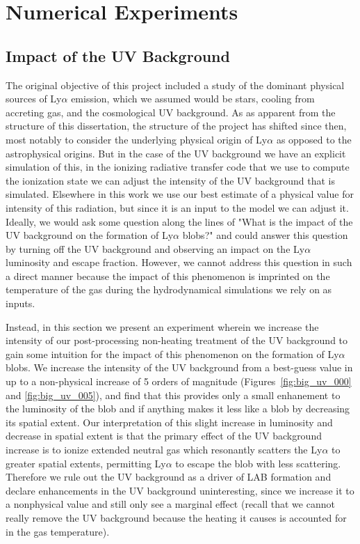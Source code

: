 \chapter{Numerical Experiments}
\label{sec:experiments}

\section{Impact of the UV Background}
The original objective of this project included a study of the dominant physical sources of Ly$\alpha$ emission, which we assumed would be stars, cooling from accreting gas, and the cosmological UV background.
As as apparent from the structure of this dissertation, the structure of the project has shifted since then, most notably to consider the underlying physical origin of Ly$\alpha$ as opposed to the astrophysical origins.
But in the case of the UV background we have an explicit simulation of this, in the ionizing radiative transfer code that we use to compute the ionization state we can adjust the intensity of the UV background that is simulated.
Elsewhere in this work we use our best estimate of a physical value for intensity of this radiation, but since it is an input to the model we can adjust it.
Ideally, we would ask some question along the lines of "What is the impact of the UV background on the formation of Ly$\alpha$ blobs?" and could answer this question by turning off the UV background and observing an impact on the Ly$\alpha$ luminosity and escape fraction.
However, we cannot address this question in such a direct manner because the impact of this phenomenon is imprinted on the temperature of the gas during the hydrodynamical simulations we rely on as inputs.

Instead, in this section we present an experiment wherein we increase the intensity of our post-processing non-heating treatment of the UV background to gain some intuition for the impact of this phenomenon on the formation of Ly$\alpha$ blobs.
We increase the intensity of the UV background from a best-guess value in \citet{Faucher-Giguere2009} up to a non-physical increase of 5 orders of magnitude (Figures~\ref{fig:big_uv_000} and \ref{fig:big_uv_005}), and find that this provides only a small enhanement to the luminosity of the blob and if anything makes it less like a blob by decreasing its spatial extent.
Our interpretation of this slight increase in luminosity and decrease in spatial extent is that the primary effect of the UV background increase is to ionize extended neutral gas which resonantly scatters the Ly$\alpha$ to greater spatial extents, permitting Ly$\alpha$ to escape the blob with less scattering.
Therefore we rule out the UV background as a driver of LAB formation and declare enhancements in the UV background uninteresting, since we increase it to a nonphysical value and still only see a marginal effect (recall that we cannot really remove the UV background because the heating it causes is accounted for in the gas temperature).


